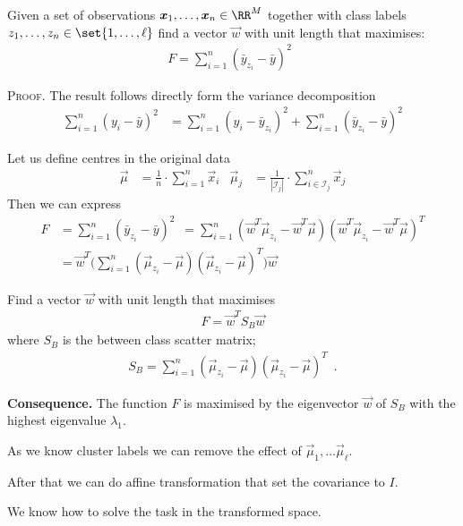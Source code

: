 \documentclass[landscape,footrule]{foils}
\begin{document}

Given a set of observations $\vec{x}_1,\ldots,\vec{x}_n\in\RR^M$ together with class labels $z_1,\ldots,z_n\in\set{1,\ldots,\ell}$ find a vector $\vec{w}$ with unit length that maximises:
\begin{align*}
F=\sum_{i=1}^n(\bar{y}_{z_i}-\bar{y})^2\enspace
\end{align*}

\textsc{Proof.}
The result follows directly form the variance decomposition
\begin{align*}
\sum_{i=1}^n (y_i-\bar{y})^2
&=\sum_{i=1}^n (y_i-\bar{y}_{z_i})^2 +\sum_{i=1}^n (\bar{y}_{z_i}-\bar{y})^2
\end{align*}




Let us define centres in the original data 
\begin{align*}
\vec{\mu}&=\frac{1}{n}\cdot\sum_{i=1}^n \vec{x}_i &
\vec{\mu}_j&=\frac{1}{|\mathcal{I}_j|}\cdot\sum_{i\in\mathcal{I}_j}^n \vec{x}_j
\end{align*}
Then we can express
\begin{align*}
F&=\sum_{i=1}^n(\bar{y}_{z_i}-\bar{y})^2\enspace
=\sum_{i=1}^n(\vec{w}^T\vec{\mu}_{z_i}-\vec{w}^T\vec{\mu})(\vec{w}^T\vec{\mu}_{z_i}-\vec{w}^T\vec{\mu})^T\\
&=\vec{w}^T\Biggl(\sum_{i=1}^n(\vec{\mu}_{z_i}-\vec{\mu})(\vec{\mu}_{z_i}-\vec{\mu})^T\Biggr)\vec{w}
\end{align*}


Find a vector $\vec{w}$ with unit length that maximises
\begin{align*}
F=\vec{w}^T S_B\vec{w}
\end{align*}
where $S_B$ is the between class scatter matrix;
\begin{align*}
S_B=\sum_{i=1}^n(\vec{\mu}_{z_i}-\vec{\mu})(\vec{\mu}_{z_i}-\vec{\mu})^T \enspace.
\end{align*} 

\textbf{Consequence.}
The function $F$ is maximised by the eigenvector $\vec{w}$ of $S_B$ with the highest eigenvalue $\lambda_1$.



\begin{triangles}
\item As we know cluster labels we can remove the effect of $\vec{\mu}_1,\ldots\vec{\mu}_\ell$.
\item After that we can do affine transformation that set the covariance to $I$.
\item We know how to solve the task in the transformed space. 
\end{triangles}
\end{document}
